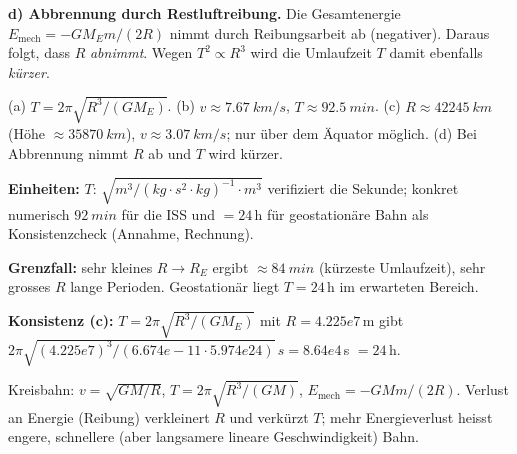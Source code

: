 \textbf{d) Abbrennung durch Restluftreibung.} Die Gesamtenergie
$E_\mathrm{mech}=-GM_Em/(2R)$ nimmt durch Reibungsarbeit ab (negativer). Daraus
folgt, dass $R$ \emph{abnimmt}. Wegen $T^2\propto R^3$ wird die Umlaufzeit
$T$ damit ebenfalls \emph{kürzer}.

\begin{ergebnis}
(a) $T=2\pi\sqrt{R^3/(GM_E)}$.
(b) $v\approx\qty{7.67}{km/s}$, $T\approx\qty{92.5}{min}$.
(c) $R\approx\qty{42245}{km}$ (Höhe $\approx\qty{35870}{km}$), $v\approx
\qty{3.07}{km/s}$; nur über dem Äquator möglich.
(d) Bei Abbrennung nimmt $R$ ab und $T$ wird kürzer.
\end{ergebnis}

\begin{kontrolle}
\textbf{Einheiten:} $T$: $\sqrt{m^3/(kg\cdot s^2\cdot kg)^{-1}\cdot m^3}$ verifiziert
die Sekunde; konkret numerisch $\qty{92}{min}$ für die ISS und $=24$\,h für
geostationäre Bahn als Konsistenzcheck (Annahme, Rechnung).

\textbf{Grenzfall:} sehr kleines $R\to R_E$ ergibt $\approx \qty{84}{min}$
(kürzeste Umlaufzeit), sehr grosses $R$ lange Perioden. Geostationär liegt
$T=24$\,h im erwarteten Bereich.

\textbf{Konsistenz (c):} $T=2\pi\sqrt{R^3/(GM_E)}$ mit $R=4.225e7$\,m gibt
$2\pi\sqrt{(4.225e7)^3/(6.674e-11\cdot5.974e24)}\,\si{s}=8.64e4$\,s $=24$\,h.
\checkmark
\end{kontrolle}

\begin{merksatz}
Kreisbahn: $v=\sqrt{GM/R}$, $T=2\pi\sqrt{R^3/(GM)}$, $E_\mathrm{mech}
=-GMm/(2R)$. Verlust an Energie (Reibung) verkleinert $R$ und verkürzt $T$;
mehr Energieverlust heisst engere, schnellere (aber langsamere lineare
Geschwindigkeit) Bahn.
\end{merksatz}
